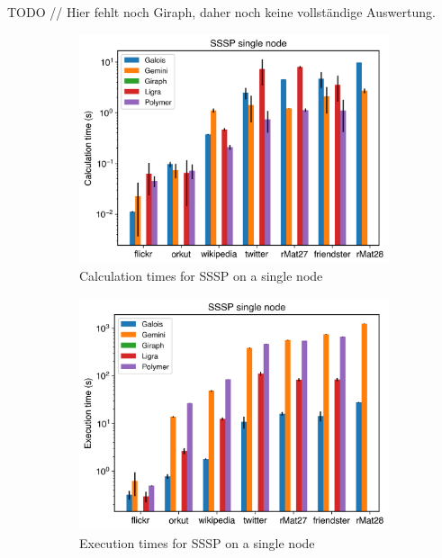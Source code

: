TODO // Hier fehlt noch Giraph, daher noch keine vollständige Auswertung.
\begin{figure}
	\begin{subfigure}{0.3\textwidth}
		\includegraphics[width=\linewidth]{../../plots/singleNodeSSSP_calcTime.png}
		\caption{Calculation times for SSSP on a single node}
		\label{fig:singleNodeSSSP_calc}
	\end{subfigure}
	\hfil
	\begin{subfigure}{0.3\textwidth}
		\includegraphics[width=\linewidth]{../../plots/singleNodeSSSP_execTime.png}
		\caption{Execution times for SSSP on a single node}
		\label{fig:singleNodeSSSP_exec}
	\end{subfigure}
	\hfil
	\begin{subfigure}{0.3\textwidth}

\end{subfigure}
\end{figure}
